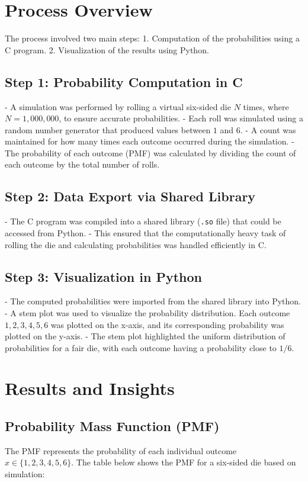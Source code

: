 \documentclass[journal]{IEEEtran}
\begin{document}
\section*{Process Overview}
The process involved two main steps: 
1. Computation of the probabilities using a C program.
2. Visualization of the results using Python.

\subsection*{Step 1: Probability Computation in C}
- A simulation was performed by rolling a virtual six-sided die \(N\) times, where \(N = 1,000,000\), to ensure accurate probabilities.
- Each roll was simulated using a random number generator that produced values between \(1\) and \(6\).
- A count was maintained for how many times each outcome occurred during the simulation.
- The probability of each outcome (PMF) was calculated by dividing the count of each outcome by the total number of rolls.

\subsection*{Step 2: Data Export via Shared Library}
- The C program was compiled into a shared library (\texttt{.so} file) that could be accessed from Python.
- This ensured that the computationally heavy task of rolling the die and calculating probabilities was handled efficiently in C.

\subsection*{Step 3: Visualization in Python}
- The computed probabilities were imported from the shared library into Python.
- A stem plot was used to visualize the probability distribution. Each outcome \(1, 2, 3, 4, 5, 6\) was plotted on the x-axis, and its corresponding probability was plotted on the y-axis.
- The stem plot highlighted the uniform distribution of probabilities for a fair die, with each outcome having a probability close to \(1/6\).

\section*{Results and Insights}
\subsection*{Probability Mass Function (PMF)}
The PMF represents the probability of each individual outcome \(x \in \{1, 2, 3, 4, 5, 6\}\). The table below shows the PMF for a six-sided die based on simulation:
\end{document}
